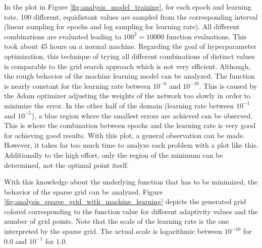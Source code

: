 In the plot in Figure \ref{fig:analysis_model_training}, for each epoch and learning rate, 100 different, equidistant values are sampled from the corresponding interval (linear sampling for epochs and log sampling for learning rate). All different combinations are evaluated leading to $ 100^2 = 10000 $ function evaluations. This took about 45 hours on a normal machine. Regarding the goal of hyperparameter optimization, this technique of trying all different combinations of distinct values is comparable to the grid search approach which is not very efficient. Although, the rough behavior of the machine learning model can be analyzed. The function is nearly constant for the learning rate between $ 10^{-6} $ and $ 10^{-10} $. This is caused by the Adam optimizer adjusting the weights of the network too slowly in order to minimize the error. In the other half of the domain (learning rate between $ 10^{-1} $ and $ 10^{-5} $), a blue region where the smallest errors are achieved can be observed. This is where the combination between epochs and the learning rate is very good for achieving good results. With this plot, a general observation can be made. However, it takes far too much time to analyze each problem with a plot like this. Additionally to the high effort, only the region of the minimum can be determined, not the optimal point itself. \newline

With this knowledge about the underlying function that has to be minimized, the behavior of the sparse grid can be analyzed. Figure \ref{fig:analysis_sparse_grid_with_machine_learning} depicts the generated grid colored corresponding to the function value for different adaptivity values and the number of grid points. Note that the scale of the learning rate is the one interpreted by the sparse grid. The actual scale is logarithmic between $ 10^{-10} $ for $ 0.0 $ and $ 10 ^{-1} $ for $ 1.0 $. 

